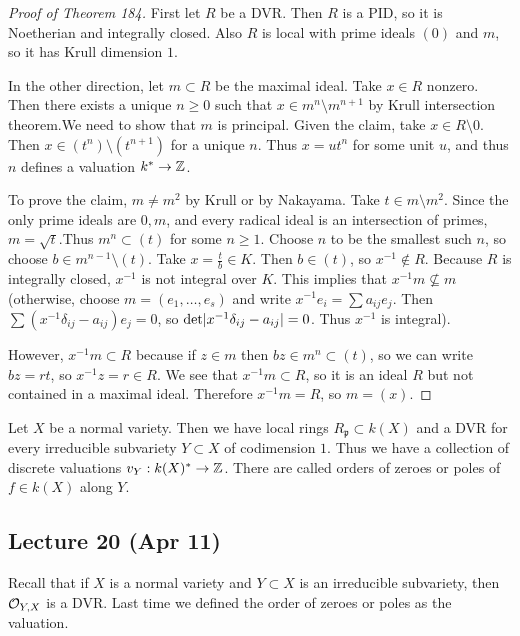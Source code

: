 \documentclass[twoside, 10pt]{article}
\begin{document}
        \begin{proof}[Proof of Theorem 184]
            First let $R$ be a DVR. Then $R$ is a PID, so it is Noetherian and integrally closed. Also $R$ is local with prime ideals $(0)$ and $m$, so it has Krull dimension $1$.

            In the other direction, let $m \subset R$ be the maximal ideal. Take $x \in R$ nonzero. Then there exists a unique $n \geq 0$ such that $x \in m^n \setminus m^{n+1}$ by Krull intersection theorem.We need to show that $m$ is principal. Given the claim, take $x \in R \setminus 0$. Then $x \in (t^n) \setminus (t^{n+1})$ for a unique $n$. Thus $x = ut^n$ for some unit $u$, and thus $n$ defines a valuation $k^* \to \mathbb{Z}$.

            To prove the claim, $m \neq m^2$ by Krull or by Nakayama. Take $t \in m \setminus m^2$. Since the only prime ideals are $0,m$, and every radical ideal is an intersection of primes, $m = \sqrt{t}$.Thus $m^n \subset (t)$ for some $n \geq 1$. Choose $n$ to be the smallest such $n$, so choose $b \in m^{n-1} \setminus (t)$. Take $x = \frac{t}{b} \in K$. Then $b \in (t)$, so $x^{-1} \notin R$. Because $R$ is integrally closed, $x^{-1}$ is not integral over $K$. This implies that $x^{-1}m \not\subseteq m$ (otherwise, choose $m=(e_1, \ldots, e_s)$ and write $x^{-1}e_i = \sum a_{ij} e_j$. Then $\sum (x^{-1} \delta_{ij} - a_{ij})e_j = 0$, so $\mathrm{det} \lvert x^{-1} \delta_{ij} - a_{ij}\rvert = 0$. Thus $x^{-1}$ is integral).

            However, $x^{-1}m \subset R$ because if $z \in m$ then $bz \in m^n \subset (t)$, so we can write $bz = rt$, so $x^{-1}z = r \in R$. We see that $x^{-1}m \subset R$, so it is an ideal $R$ but not contained in a maximal ideal. Therefore $x^{-1}m = R$, so $m = (x)$.
        \end{proof}

        Let $X$ be a normal variety. Then we have local rings $R_{\mathfrak{p}} \subset k(X)$ and a DVR for every irreducible subvariety $Y \subset X$ of codimension $1$. Thus we have a collection of discrete valuations $v_Y: k(X)^* \to \mathbb{Z}$. There are called orders of zeroes or poles of $f \in k(X)$ along $Y$.

        \subsection{Lecture 20 (Apr 11)}
        Recall that if $X$ is a normal variety and $Y \subset X$ is an irreducible subvariety, then $\mathcal{O}_{Y,X}$ is a DVR. Last time we defined the order of zeroes or poles as the valuation.
\end{document}
